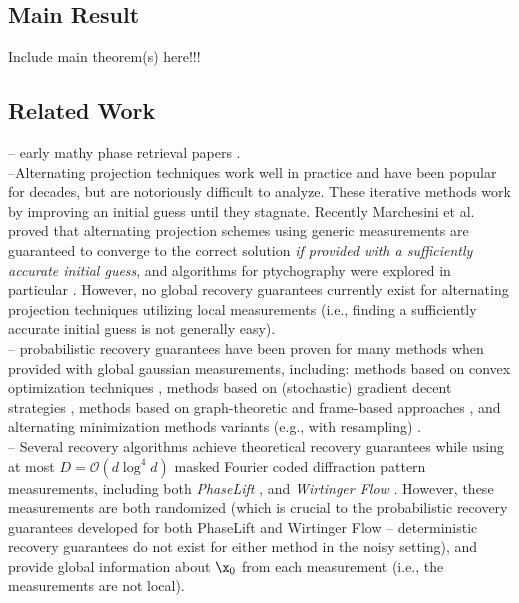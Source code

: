 \subsection{Main Result}
\label{sec:mainRes}
Include main theorem(s) here!!!
%
%
\subsection{Related Work}
\label{sec:lit}

-- early mathy phase retrieval papers \cite{balan2006signal,balan2009painless}.\\

--Alternating projection techniques \cite{gerchberg1972practical,fienup1978reconstruction} work well in practice and have been popular for decades, but are notoriously difficult to analyze.  These iterative methods work by improving an initial guess until they stagnate.  Recently Marchesini et al. proved that alternating projection schemes using generic measurements are guaranteed to converge to the correct solution {\em if provided with a sufficiently accurate initial guess}, and algorithms for ptychography were explored in particular \cite{marchesini2015alternating}.  However, no global recovery guarantees currently exist for alternating projection techniques utilizing local measurements (i.e., finding a sufficiently accurate initial guess is not generally easy).\\

-- probabilistic recovery guarantees have been proven for many methods when provided with global gaussian measurements, including: methods based on convex optimization techniques \cite{candes2012phaselift,candes2014solving}, methods based on (stochastic) gradient decent strategies \cite{candes2015phase}, methods based on graph-theoretic and frame-based approaches  \cite{alexeev2014phase}, and alternating minimization methods variants (e.g., with resampling) \cite{netrapalli2013phase}. \\

-- Several recovery algorithms achieve theoretical recovery guarantees while using at most $D = \mathcal{O}(d \log^4 d)$ masked Fourier coded diffraction pattern measurements, including both {\em PhaseLift} \cite{Candes2014WF,gross2015improved}, and {\em Wirtinger Flow} \cite{candes2015phase}.  However, these measurements are both randomized (which is crucial to the probabilistic recovery guarantees developed for both PhaseLift and Wirtinger Flow -- deterministic recovery guarantees do not exist for either method in the noisy setting), and provide global information about $\x_0$ from each measurement (i.e., the measurements are not local).\\

